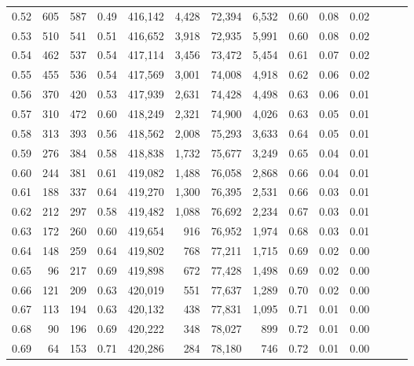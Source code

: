 \begin{tabular}{rrrrrrrrrrrrrr}
0.52 &     605 &    587 &  0.49 &  416,142 &    4,428 &  72,394 &   6,532 &  0.60 &  0.08 &      0.02 \\
0.53 &     510 &    541 &  0.51 &  416,652 &    3,918 &  72,935 &   5,991 &  0.60 &  0.08 &      0.02 \\
0.54 &     462 &    537 &  0.54 &  417,114 &    3,456 &  73,472 &   5,454 &  0.61 &  0.07 &      0.02 \\
0.55 &     455 &    536 &  0.54 &  417,569 &    3,001 &  74,008 &   4,918 &  0.62 &  0.06 &      0.02 \\
0.56 &     370 &    420 &  0.53 &  417,939 &    2,631 &  74,428 &   4,498 &  0.63 &  0.06 &      0.01 \\
0.57 &     310 &    472 &  0.60 &  418,249 &    2,321 &  74,900 &   4,026 &  0.63 &  0.05 &      0.01 \\
0.58 &     313 &    393 &  0.56 &  418,562 &    2,008 &  75,293 &   3,633 &  0.64 &  0.05 &      0.01 \\
0.59 &     276 &    384 &  0.58 &  418,838 &    1,732 &  75,677 &   3,249 &  0.65 &  0.04 &      0.01 \\
0.60 &     244 &    381 &  0.61 &  419,082 &    1,488 &  76,058 &   2,868 &  0.66 &  0.04 &      0.01 \\
0.61 &     188 &    337 &  0.64 &  419,270 &    1,300 &  76,395 &   2,531 &  0.66 &  0.03 &      0.01 \\
0.62 &     212 &    297 &  0.58 &  419,482 &    1,088 &  76,692 &   2,234 &  0.67 &  0.03 &      0.01 \\
0.63 &     172 &    260 &  0.60 &  419,654 &      916 &  76,952 &   1,974 &  0.68 &  0.03 &      0.01 \\
0.64 &     148 &    259 &  0.64 &  419,802 &      768 &  77,211 &   1,715 &  0.69 &  0.02 &      0.00 \\
0.65 &      96 &    217 &  0.69 &  419,898 &      672 &  77,428 &   1,498 &  0.69 &  0.02 &      0.00 \\
0.66 &     121 &    209 &  0.63 &  420,019 &      551 &  77,637 &   1,289 &  0.70 &  0.02 &      0.00 \\
0.67 &     113 &    194 &  0.63 &  420,132 &      438 &  77,831 &   1,095 &  0.71 &  0.01 &      0.00 \\
0.68 &      90 &    196 &  0.69 &  420,222 &      348 &  78,027 &     899 &  0.72 &  0.01 &      0.00 \\
0.69 &      64 &    153 &  0.71 &  420,286 &      284 &  78,180 &     746 &  0.72 &  0.01 &      0.00 \\

\end{tabular}
